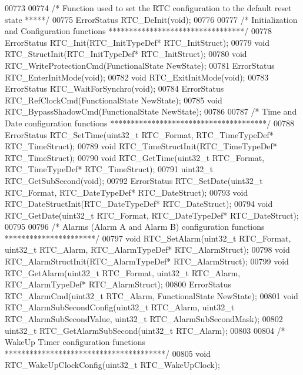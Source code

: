 \begin{DoxyCode}
00773 
00774 \textcolor{comment}{/*  Function used to set the RTC configuration to the default reset state *****/}
00775 ErrorStatus RTC_DeInit(\textcolor{keywordtype}{void});
00776 
00777 \textcolor{comment}{/* Initialization and Configuration functions *********************************/}
00778 ErrorStatus RTC_Init(RTC\_InitTypeDef* RTC\_InitStruct);
00779 \textcolor{keywordtype}{void} RTC_StructInit(RTC\_InitTypeDef* RTC\_InitStruct);
00780 \textcolor{keywordtype}{void} RTC_WriteProtectionCmd(FunctionalState NewState);
00781 ErrorStatus RTC_EnterInitMode(\textcolor{keywordtype}{void});
00782 \textcolor{keywordtype}{void} RTC_ExitInitMode(\textcolor{keywordtype}{void});
00783 ErrorStatus RTC_WaitForSynchro(\textcolor{keywordtype}{void});
00784 ErrorStatus RTC_RefClockCmd(FunctionalState NewState);
00785 \textcolor{keywordtype}{void} RTC_BypassShadowCmd(FunctionalState NewState);
00786 
00787 \textcolor{comment}{/* Time and Date configuration functions **************************************/}
00788 ErrorStatus RTC_SetTime(uint32\_t RTC\_Format, RTC\_TimeTypeDef* RTC\_TimeStruct);
00789 \textcolor{keywordtype}{void} RTC_TimeStructInit(RTC\_TimeTypeDef* RTC\_TimeStruct);
00790 \textcolor{keywordtype}{void} RTC_GetTime(uint32\_t RTC\_Format, RTC\_TimeTypeDef* RTC\_TimeStruct);
00791 uint32\_t RTC_GetSubSecond(\textcolor{keywordtype}{void});
00792 ErrorStatus RTC_SetDate(uint32\_t RTC\_Format, RTC\_DateTypeDef* RTC\_DateStruct);
00793 \textcolor{keywordtype}{void} RTC_DateStructInit(RTC\_DateTypeDef* RTC\_DateStruct);
00794 \textcolor{keywordtype}{void} RTC_GetDate(uint32\_t RTC\_Format, RTC\_DateTypeDef* RTC\_DateStruct);
00795 
00796 \textcolor{comment}{/* Alarms (Alarm A and Alarm B) configuration functions  **********************/}
00797 \textcolor{keywordtype}{void} RTC_SetAlarm(uint32\_t RTC\_Format, uint32\_t RTC\_Alarm, RTC\_AlarmTypeDef* RTC\_AlarmStruct);
00798 \textcolor{keywordtype}{void} RTC_AlarmStructInit(RTC\_AlarmTypeDef* RTC\_AlarmStruct);
00799 \textcolor{keywordtype}{void} RTC_GetAlarm(uint32\_t RTC\_Format, uint32\_t RTC\_Alarm, RTC\_AlarmTypeDef* RTC\_AlarmStruct);
00800 ErrorStatus RTC_AlarmCmd(uint32\_t RTC\_Alarm, FunctionalState NewState);
00801 \textcolor{keywordtype}{void} RTC_AlarmSubSecondConfig(uint32\_t RTC\_Alarm, uint32\_t RTC\_AlarmSubSecondValue, uint32\_t 
      RTC\_AlarmSubSecondMask);
00802 uint32\_t RTC_GetAlarmSubSecond(uint32\_t RTC\_Alarm);
00803 
00804 \textcolor{comment}{/* WakeUp Timer configuration functions ***************************************/}
00805 \textcolor{keywordtype}{void} RTC_WakeUpClockConfig(uint32\_t RTC\_WakeUpClock);

\end{DoxyCode}
